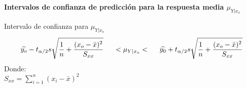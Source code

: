 \documentclass[base=hide,12pt]{elegantbook}
\begin{document}
\textcolor{col4}{ \bf Intervalos de confianza de predicción para la respuesta media $\mu_{Y|x_{o}}$} \\

\begin{Box2}{Intervalo de confianza para $\mu_{Y|x_{o}}$}
	$$
	\widehat{y_{o}} - t_{\alpha/2} s \sqrt{\dfrac{1}{n}+ \dfrac{(x_{o}-\bar{x})^{2}}{S_{xx}}}
	\hspace{.5cm}< \mu_{Y|x_{o}} < \hspace{.5cm}
	\widehat{y_{0}} + t_{\alpha/2} s \sqrt{\dfrac{1}{n}+ \dfrac{(x_{o}-\bar{x})^{2}}{S_{xx}}}
	$$
	Donde: \\
	$S_{xx}=\displaystyle\sum_{i=1}^{n} (x_{i}-\bar{x})^{2}$	
	
\end{Box2}

	
\end{document}
